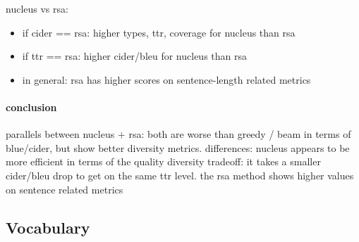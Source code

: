 \documentclass[11pt,a4paper]{article}
\begin{document}
nucleus vs rsa: 
\begin{itemize}
    \item if cider == rsa: higher types, ttr, coverage for nucleus than rsa
    \item if ttr == rsa: higher cider/bleu for nucleus than rsa
    \item in general: rsa has higher scores on sentence-length related metrics 
\end{itemize}

\paragraph{conclusion}
parallels between nucleus + rsa: both are worse than greedy / beam in terms of blue/cider, but show better diversity metrics. differences: nucleus appears to be more efficient in terms of the quality diversity tradeoff: it takes a smaller cider/bleu drop to get on the same ttr level. the rsa method shows higher values on sentence related metrics 










\subsection{Vocabulary}
\end{document}
